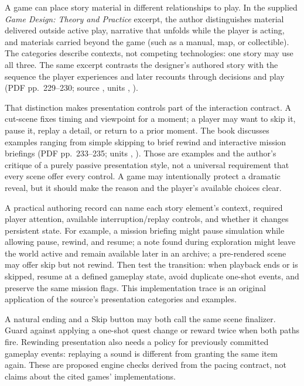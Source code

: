 \hypertarget{06-engine-ii-ch047-let-players-control-narrative-pacing-as-well-as-branching}{}

A game can place story material in different relationships to play. In the supplied \emph{Game Design: Theory and Practice} excerpt, the author distinguishes material delivered outside active play, narrative that unfolds while the player is acting, and materials carried beyond the game (such as a manual, map, or collectible). The categories describe contexts, not competing technologies: one story may use all three. The same excerpt contrasts the designer's authored story with the sequence the player experiences and later recounts through decisions and play (PDF pp.~229--230; source , units , ).

That distinction makes presentation controls part of the interaction contract. A cut-scene fixes timing and viewpoint for a moment; a player may want to skip it, pause it, replay a detail, or return to a prior moment. The book discusses examples ranging from simple skipping to brief rewind and interactive mission briefings (PDF pp.~233--235; units , ). Those are examples and the author's critique of a purely passive presentation style, not a universal requirement that every scene offer every control. A game may intentionally protect a dramatic reveal, but it should make the reason and the player's available choices clear.

A practical authoring record can name each story element's context, required player attention, available interruption/replay controls, and whether it changes persistent state. For example, a mission briefing might pause simulation while allowing pause, rewind, and resume; a note found during exploration might leave the world active and remain available later in an archive; a pre-rendered scene may offer skip but not rewind. Then test the transition: when playback ends or is skipped, resume at a defined gameplay state, avoid duplicate one-shot events, and preserve the same mission flags. This implementation trace is an original application of the source's presentation categories and examples.

A natural ending and a Skip button may both call the same scene finalizer. Guard against applying a one-shot quest change or reward twice when both paths fire. Rewinding presentation also needs a policy for previously committed gameplay events: replaying a sound is different from granting the same item again. These are proposed engine checks derived from the pacing contract, not claims about the cited games' implementations.

